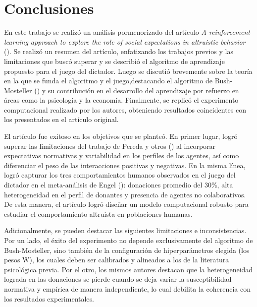 \documentclass[12pt,a4paper]{article}
\begin{document}
\section{Conclusiones}

En este trabajo se realizó un análisis pormenorizado del artículo \textit{A reinforcement learning approach to 
explore the role of social expectations in altruistic behavior} (\cite{castanon2023reinforcement}). Se realizó 
un resumen del artículo, enfatizando los trabajos previos y las limitaciones que buscó superar y se describió el 
algoritmo de aprendizaje propuesto para el juego del dictador. Luego se discutió brevemente sobre la teoría en 
la que se funda el algoritmo y el juego,destacando el algoritmo de Bush-Mosteller (\citeyear
{bush1951mathematical}) y su contribución en el desarrollo del aprendizaje por refuerzo en áreas como la 
psicología y la economía. Finalmente, se replicó el experimento computacional realizado por los autores, 
obteniendo resultados coincidentes con los presentados en el artículo original.

El artículo fue exitoso en los objetivos que se planteó. En primer lugar, logró superar las 
limitaciones del trabajo de Pereda y otros (\citeyear{pereda2017emergence}) al incorporar expectativas 
normativas y variabilidad en los perfiles de los agentes, así como diferenciar el peso de las interacciones
positivas y negativas. En la misma línea, logró capturar  los tres comportamientos humanos observados en el 
juego del dictador en el meta-análisis de Engel (\citeyear{engel2011dictator}): donaciones promedio del 30\%, 
alta heterogeneidad en el perfil de donantes y presencia de agentes no colaborativos. De esta manera, el 
artículo logró diseñar un modelo computacional robusto para estudiar el comportamiento altruista en poblaciones 
humanas.

Adicionalmente, se pueden destacar las siguientes limitaciones e inconsistencias. Por un lado, el éxito del 
experimento no depende exclusivamente del algoritmo de Bush-Mosteller, sino también de la configuración de 
hiperparámetros elegida (los pesos W), los cuales deben ser calibrados y alineados a los de la literatura 
psicológica previa. Por el otro, los mismos autores destacan que la heterogeneidad lograda en las donaciones se 
pierde cuando se deja variar la susceptibilidad normativa y empírica de manera independiente, lo cual debilita 
la coherencia con los resultados experimentales.
\end{document}
